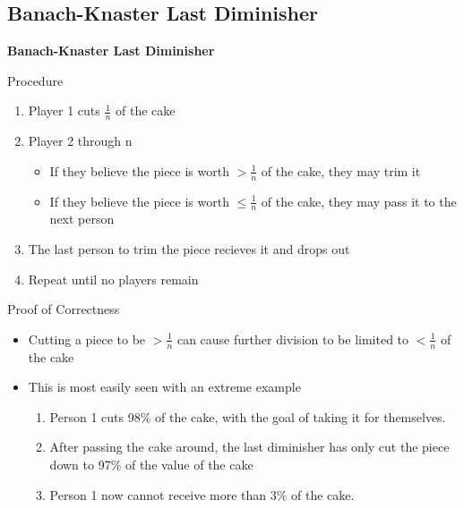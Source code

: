 \documentclass[aspectratio=169,xcolor=dvipsnames]{beamer}
\begin{document}
\subsection{Banach-Knaster Last Diminisher}
\begin{frame}
	\Huge{\centerline{\textbf{Banach-Knaster Last Diminisher}}}
\end{frame}
\begin{frame}{Procedure}
	\begin{enumerate}
		\item Player 1 cuts $\frac{1}{n}$ of the cake
		\item Player 2 through n
		\begin{itemize}
			\item If they believe the piece is worth $> \frac{1}{n}$ of the cake, they may trim it
			\item If they believe the piece is worth $\leq \frac{1}{n}$ of the cake, they may pass it to the next person
		\end{itemize} \pause
		\item The last person to trim the piece recieves it and drops out\pause
		\item Repeat until no players remain
	\end{enumerate}
\end{frame}
\begin{frame}{Proof of Correctness}
	\begin{itemize}
		\item Cutting a piece to be $> \frac{1}{n}$ can cause further division to be limited to $< \frac{1}{n}$ of the cake
		\item This is most easily seen with an extreme example \pause
		\begin{enumerate}
			\item Person 1 cuts 98\% of the cake, with the goal of taking it for themselves.
			\item After passing the cake around, the last diminisher has only cut the piece down to 97\% of the value of the cake
			\item Person 1 now cannot receive more than 3\% of the cake.
		\end{enumerate}
	\end{itemize}
\end{frame}
\end{document}
